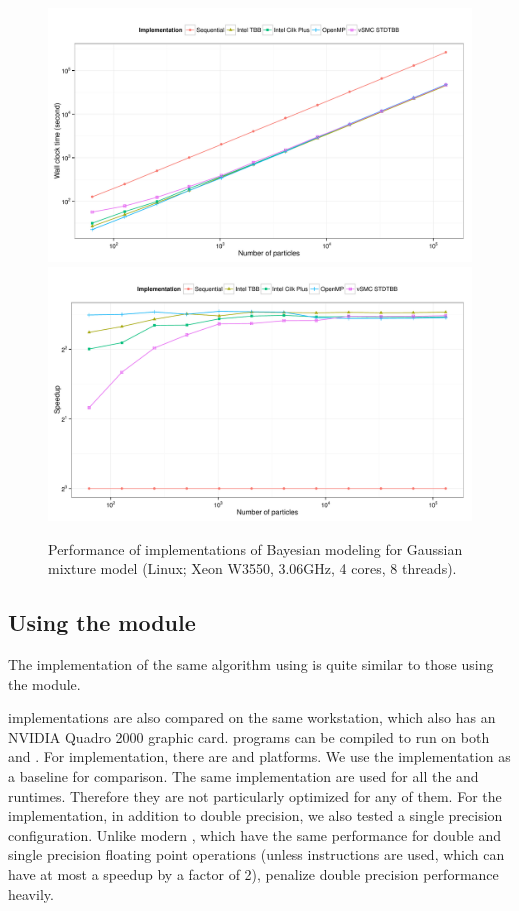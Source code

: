 \begin{figure}
  \centering
  \includegraphics[width=\linewidth]{fig/bench-smp-time-running}
  \includegraphics[width=\linewidth]{fig/bench-smp-speedup-running}
  \caption[Performance of \protect\vsmc \protect\smp implementations]
  {Performance of \cpp implementations of Bayesian modeling for
    Gaussian mixture model (Linux; Xeon W3550, 3.06GHz, 4 cores, 8 threads).}
  \label{fig:bench-smp-perf}
\end{figure}

\subsection{Using the \protect\opencl module}
\label{sub:Using the OpenCL module}

The implementation of the same algorithm using \opencl is quite similar to
those using the \smp module.

\opencl implementations are also compared on the same workstation, which also
has an NVIDIA Quadro 2000 graphic card. \opencl programs can be compiled to
run on both \cpu and \gpu. For \cpu implementation, there are \iocl
\cite{iocl} and \aocl \cite{aocl} platforms. We use the \tbb implementation as
a baseline for comparison. The same \opencl implementation are used for all
the \cpu and \gpu runtimes.  Therefore they are not particularly optimized for
any of them. For the \gpu implementation, in addition to double precision, we
also tested a single precision configuration. Unlike modern \cpu, which have
the same performance for double and single precision floating point operations
(unless \simd instructions are used, which can have at most a speedup by a
factor of 2), \gpu penalize double precision performance heavily.


